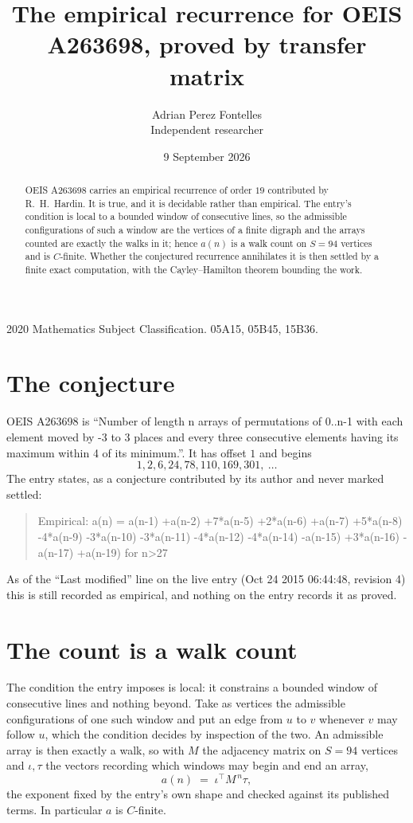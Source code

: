 \documentclass[11pt,a4paper]{article}
\title{The empirical recurrence for OEIS A263698, proved by transfer matrix}
\author{Adrian Perez Fontelles\\ \small Independent researcher}
\date{9 September 2026}
\theoremstyle{plain}
\theoremstyle{definition}
\begin{document}
\maketitle

\begin{abstract}
OEIS A263698 carries an empirical recurrence of order $19$ contributed by R.~H.~Hardin. It is
true, and it is decidable rather than empirical. The entry's condition is local to a bounded window of consecutive lines, so
the admissible configurations of such a window are the vertices of a finite digraph and the
arrays counted are exactly the walks in it; hence $a(n)$ is a walk count on $S=94$ vertices
and is $C$-finite. Whether the conjectured recurrence annihilates it is then settled by a
finite exact computation, with the Cayley--Hamilton theorem bounding the work.
\end{abstract}

\noindent\small 2020 Mathematics Subject Classification. 05A15, 05B45, 15B36.\normalsize

\section{The conjecture}

OEIS A263698 is ``Number of length n arrays of permutations of 0..n-1 with each element moved by -3 to 3 places and every three consecutive elements having its maximum within 4 of its minimum.''. It has offset $1$ and begins
\[
1, 2, 6, 24, 78, 110, 169, 301,\ \dots
\]
The entry states, as a conjecture contributed by its author and never marked settled:
\begin{quote}
Empirical: a(n) = a(n-1) +a(n-2) +7*a(n-5) +2*a(n-6) +a(n-7) +5*a(n-8) -4*a(n-9) -3*a(n-10) -3*a(n-11) -4*a(n-12) -4*a(n-14) -a(n-15) +3*a(n-16) -a(n-17) +a(n-19) for n>27
\end{quote}
As of the ``Last modified'' line on the live entry (Oct 24 2015 06:44:48, revision 4) this is still
recorded as empirical, and nothing on the entry records it as proved.

\section{The count is a walk count}

The condition the entry imposes is local: it constrains a bounded window of consecutive lines and nothing beyond. Take as
vertices the admissible configurations of one such window and put an edge from $u$ to $v$
whenever $v$ may follow $u$, which the condition decides by inspection of the two. An
admissible array is then exactly a walk, so with $M$ the adjacency matrix on $S=94$ vertices
and $\iota,\tau$ the vectors recording which windows may begin and end an array,
\[
a(n)\;=\;\iota^{\!\top}M^{\,n}\tau ,
\]
the exponent fixed by the entry's own shape and checked against its published terms. In
particular $a$ is $C$-finite.
\end{document}
